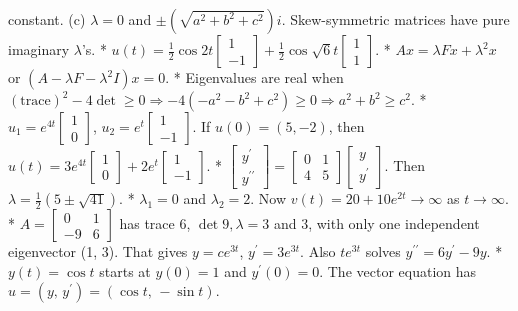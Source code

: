 constant. (c) \(\lambda=0\) and \(\pm(\sqrt{a^{2}+b^{2}+c^{2}})i\). Skew-symmetric matrices have pure imaginary \(\lambda\)'s.
* \(u(t)=\frac{1}{2}\cos 2t\left[\begin{matrix}1\\ -1\end{matrix}\right]+\frac{1}{2}\cos\sqrt{6}t\left[\begin{matrix}1\\ 1\end{matrix}\right]\).
* \(Ax=\lambda Fx+\lambda^{2}x\) or \((A-\lambda F-\lambda^{2}I)x=0\).
* Eigenvalues are real when \((\text{trace})^{2}-4\det\geq 0\Rightarrow-4(-a^{2}-b^{2}+c^{2})\geq 0\Rightarrow a ^{2}+b^{2}\geq c^{2}\).
* \(u_{1}=e^{4t}\left[\begin{matrix}1\\ 0\end{matrix}\right]\), \(u_{2}=e^{t}\left[\begin{matrix}1\\ -1\end{matrix}\right]\). If \(u(0)=(5,-2)\), then \(u(t)=3e^{4t}\left[\begin{matrix}1\\ 0\end{matrix}\right]+2e^{t}\left[\begin{matrix}1\\ -1\end{matrix}\right]\).
* \(\left[\begin{matrix}y^{\prime}\\ y^{\prime\prime}\end{matrix}\right]=\left[\begin{matrix}0&1\\ 4&5\end{matrix}\right]\left[\begin{matrix}y\\ y^{\prime}\end{matrix}\right]\). Then \(\lambda=\frac{1}{2}(5\pm\sqrt{41})\).
* \(\lambda_{1}=0\) and \(\lambda_{2}=2\). Now \(v(t)=20+10e^{2t}\rightarrow\infty\) as \(t\rightarrow\infty\).
* \(A=\left[\begin{matrix}0&1\\ -9&6\end{matrix}\right]\) has trace \(6\), \(\det 9,\lambda=3\) and \(3\), with only one independent eigenvector (1, 3). That gives \(y=ce^{3t}\), \(y^{\prime}=3e^{3t}\). Also \(te^{3t}\) solves \(y^{\prime\prime}=6y^{\prime}-9y\).
* \(y(t)=\cos t\) starts at \(y(0)=1\) and \(y^{\prime}(0)=0\). The vector equation has \(u=(y,\,y^{\prime})=(\cos t,\,-\sin t)\).

